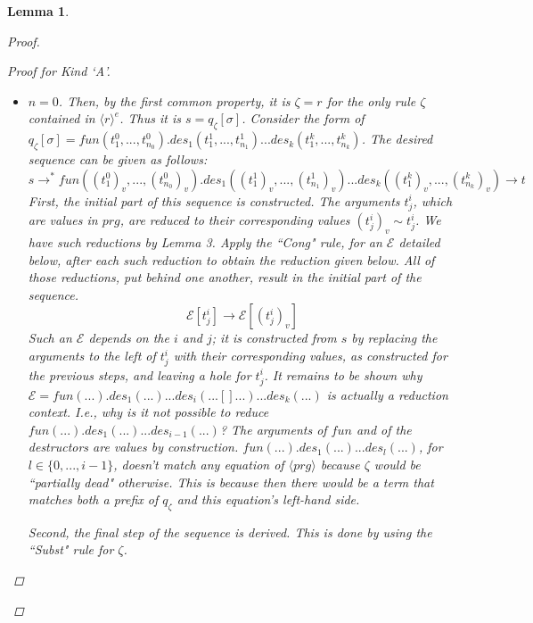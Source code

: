 \documentclass[11pt]{article} %
\newtheorem{lemma}{Lemma}
\begin{document}
\begin{lemma}
\begin{proof}
\begin{enumerate}
\begin{proof}[Proof for Kind `A']
\begin{itemize}
\item $n = 0$. Then, by the first common property, it is $\zeta = r$ for the only rule $\zeta$ contained in $\langle r \rangle^e$. Thus it is $s = q_\zeta[\sigma]$. Consider the form of $q_\zeta[\sigma] = fun(t^0_1, ..., t^0_{n_0}).des_1(t^1_1, ..., t^1_{n_1})...des_k(t^k_1, ..., t^k_{n_k})$. The desired sequence can be given as follows:
\begin{equation*}
s \longrightarrow^* fun((t^0_1)_v, ..., (t^0_{n_0})_v).des_1((t^1_1)_v, ..., (t^1_{n_1})_v)...des_k((t^k_1)_v, ..., (t^k_{n_k})_v) \longrightarrow t
\end{equation*}
First, the initial part of this sequence is constructed. The arguments $t^i_j$, which are values in $prg$, are reduced to their corresponding values $(t^i_j)_v \sim t^i_j$. We have such reductions by Lemma 3. Apply the ``Cong" rule, for an $\mathcal{E}$ detailed below, after each such reduction to obtain the reduction given below. All of those reductions, put behind one another, result in the initial part of the sequence.
\begin{equation*}
\mathcal{E}[t^i_j] \longrightarrow \mathcal{E}[(t^i_j)_v]
\end{equation*}
Such an $\mathcal{E}$ depends on the $i$ and $j$; it is constructed from $s$ by replacing the arguments to the left of $t^i_j$ with their corresponding values, as constructed for the previous steps, and leaving a hole for $t^i_j$. It remains to be shown why $\mathcal{E} = fun(...).des_1(...)...des_i(...[]...)...des_k(...)$ is actually a reduction context. I.e., why is it not possible to reduce $fun(...).des_1(...)...des_{i-1}(...)$? The arguments of $fun$ and of the destructors are values by construction. $fun(...).des_1(...)...des_l(...)$, for $l \in \{0, ..., i-1\}$, doesn't match any equation of $\langle prg \rangle$ because $\zeta$ would be ``partially dead" otherwise. This is because then there would be a term that matches both a prefix of $q_\zeta$ and this equation's left-hand side.

Second, the final step of the sequence is derived. This is done by using the ``Subst" rule for $\zeta$.


\end{itemize}
\end{proof}
\end{enumerate}
\end{proof}
\end{lemma}
\end{document}
